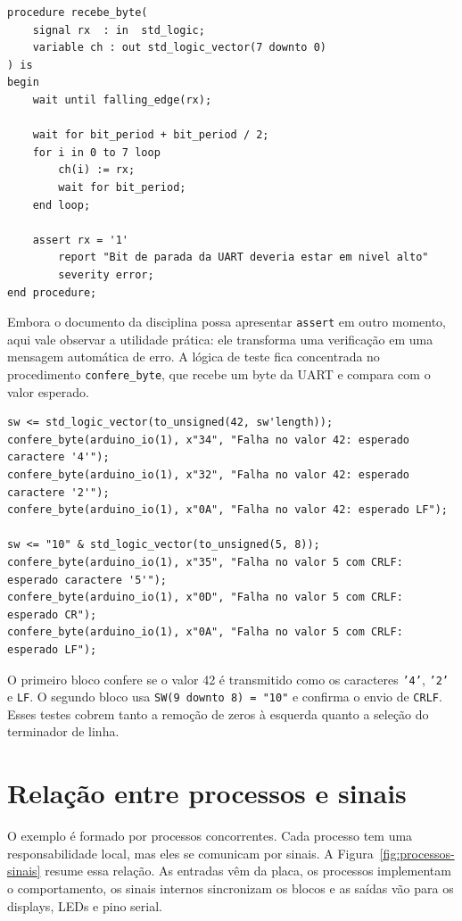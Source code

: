 \documentclass[12pt,a4paper]{book}
\begin{document}
\begin{lstlisting}[caption={Procedimento que recebe um byte UART no testbench.}]
procedure recebe_byte(
    signal rx  : in  std_logic;
    variable ch : out std_logic_vector(7 downto 0)
) is
begin
    wait until falling_edge(rx);

    wait for bit_period + bit_period / 2;
    for i in 0 to 7 loop
        ch(i) := rx;
        wait for bit_period;
    end loop;

    assert rx = '1'
        report "Bit de parada da UART deveria estar em nivel alto"
        severity error;
end procedure;
\end{lstlisting}

Embora o documento da disciplina possa apresentar \texttt{assert} em outro momento, aqui vale observar a utilidade prática: ele transforma uma verificação em uma mensagem automática de erro. A lógica de teste fica concentrada no procedimento \texttt{confere\_byte}, que recebe um byte da UART e compara com o valor esperado.

\begin{lstlisting}[caption={Exemplos de estímulos usados no testbench.}]
sw <= std_logic_vector(to_unsigned(42, sw'length));
confere_byte(arduino_io(1), x"34", "Falha no valor 42: esperado caractere '4'");
confere_byte(arduino_io(1), x"32", "Falha no valor 42: esperado caractere '2'");
confere_byte(arduino_io(1), x"0A", "Falha no valor 42: esperado LF");

sw <= "10" & std_logic_vector(to_unsigned(5, 8));
confere_byte(arduino_io(1), x"35", "Falha no valor 5 com CRLF: esperado caractere '5'");
confere_byte(arduino_io(1), x"0D", "Falha no valor 5 com CRLF: esperado CR");
confere_byte(arduino_io(1), x"0A", "Falha no valor 5 com CRLF: esperado LF");
\end{lstlisting}

O primeiro bloco confere se o valor 42 é transmitido como os caracteres \texttt{'4'}, \texttt{'2'} e \texttt{LF}. O segundo bloco usa \texttt{SW(9 downto 8) = "10"} e confirma o envio de \texttt{CRLF}. Esses testes cobrem tanto a remoção de zeros à esquerda quanto a seleção do terminador de linha.

\section{Relação entre processos e sinais}

O exemplo é formado por processos concorrentes. Cada processo tem uma responsabilidade local, mas eles se comunicam por sinais. A Figura~\ref{fig:processos-sinais} resume essa relação. As entradas vêm da placa, os processos implementam o comportamento, os sinais internos sincronizam os blocos e as saídas vão para os displays, LEDs e pino serial.
\end{document}

